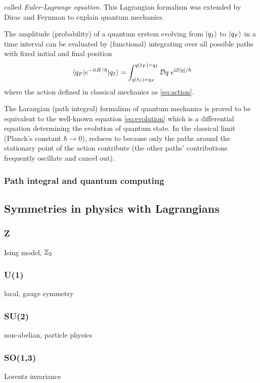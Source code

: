 called \emph{Euler-Lagrange equation}.
This Lagrangian formalism was extended by Dirac \cite{diracAnalogyClassicalQuantum1945} and Feynman \cite{feynmanQuantumMechanicsPath2010} to explain quantum mechanics. 
\begin{axiom}\label{thm:path_integral}
    The amplitude (probability) of a quantum system evolving from $\ket{q_I}$ to $\ket{q_F}$ in a time interval can be evaluated by (functional) integrating over all possible paths with fixed initial and final position 
    \begin{equation}
		\mel{q_F}{e^{-\textup{i}t\hat{H}/\hbar}}{q_I} =
        \int_{q(t_I)= q_F}^{q(t_F)=q_I} \mathcal{D} q \; e^{\textup{i} \mathcal{S}[q]/\hbar}
    \end{equation}
	where the action defined in classical mechanics as \cref{eq:action}.
\end{axiom}
The Larangian (path integral) formalism of quantum mechanics is proved to be equivalent to the well-known \schrodinger equation \cref{eq:evolution} \cite[Chp4]{feynmanQuantumMechanicsPath2010} 
which is a differential equation determining the evolution of quantum state.
In the classical limit (Planck's constant $\hbar\to 0$),  reduces to 
because only the paths around the stationary point of the action contribute 
(the other paths' contributions frequently oscillate and cancel out).
\subsubsection{Path integral and quantum computing}
\cite{xuLagrangianFormalismQuantum2021}

\subsection{Symmetries in physics with Lagrangians}
\subsubsection{Z}
Ising model, $\mathbb{Z}_2$

\subsubsection{U(1)}
\cite{kogutIntroductionLatticeGauge1979}
local, gauge symmetry

\subsubsection{SU(2)}
non-abelian, particle physics

\subsubsection{SO(1,3)}
Lorentz invariance